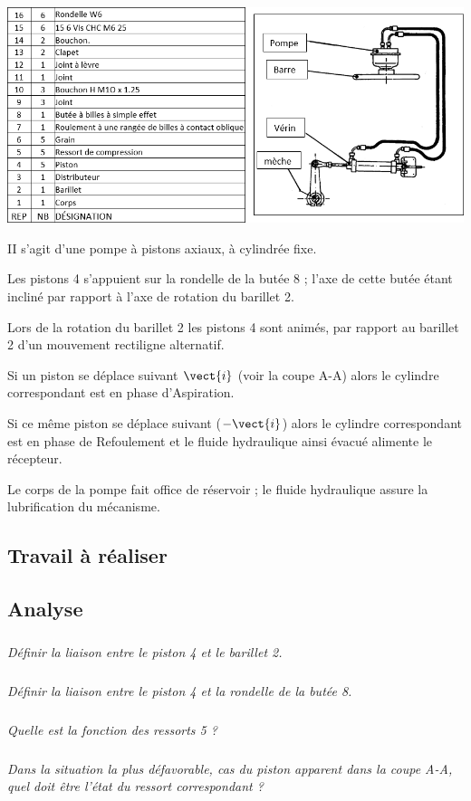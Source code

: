 \begin{multicols}{2}
\begin{multicols}{2}
\begin{center}
\includegraphics[width=\linewidth]{images/fig_02}
\end{center}

II s'agit d'une pompe à pistons axiaux, à cylindrée fixe.

Les pistons 4 s'appuient sur la rondelle de la butée 8 ; l'axe de cette butée étant incliné par rapport à l'axe de rotation du barillet  2.

Lors de la rotation du barillet 2 les pistons 4 sont animés, par rapport au barillet 2 d'un mouvement rectiligne alternatif. 

Si un piston se déplace suivant $\vect{i}$ (voir la coupe A-A) alors le cylindre correspondant est en phase d'Aspiration.

Si ce même piston se déplace suivant ($-\vect{i}$) alors le cylindre correspondant est en phase de Refoulement et le fluide hydraulique ainsi évacué alimente le récepteur.

Le corps de la pompe fait office de réservoir ; le fluide hydraulique assure la lubrification du mécanisme.


\subsection*{Travail à réaliser}
\subsection*{Analyse}
\subparagraph{}\textit{Définir la liaison entre le piston 4 et le barillet 2.}

\subparagraph{}\textit{Définir la liaison entre le piston 4 et la rondelle de la butée 8.}

\subparagraph{}\textit{Quelle est la fonction des ressorts 5 ?}

\subparagraph{}\textit{Dans la situation la plus défavorable, cas du piston apparent dans la coupe A-A, quel doit être l’état du ressort correspondant ?}





\end{multicols}
\end{multicols}
